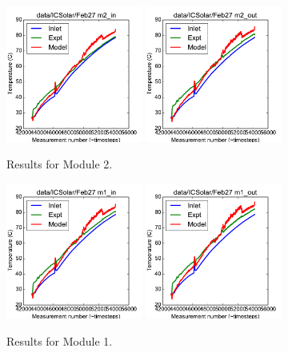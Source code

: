 \documentclass{article}
\begin{document}
\clearpage
\begin{figure}[!ht]
\centering
\includegraphics[width=0.4\textwidth]{../../data/ICSolar/images/Feb27_m2_in_unsteady.pdf}\hspace{0.05\textwidth}
\includegraphics[width=0.4\textwidth]{../../data/ICSolar/images/Feb27_m2_out_unsteady.pdf}\hspace{0.05\textwidth}\\
\caption{Results for Module 2.}\end{figure}
\begin{figure}[!ht]
\centering
\includegraphics[width=0.4\textwidth]{../../data/ICSolar/images/Feb27_m1_in_unsteady.pdf}\hspace{0.05\textwidth}
\includegraphics[width=0.4\textwidth]{../../data/ICSolar/images/Feb27_m1_out_unsteady.pdf}\hspace{0.05\textwidth}\\
\caption{Results for Module 1.}\end{figure}
\end{document}
